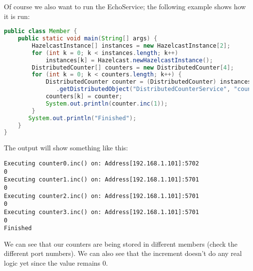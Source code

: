 Of course we also want to run the EchoService; the following example shows how it is run:
\begin{lstlisting}[language=java]
public class Member {
    public static void main(String[] args) {
        HazelcastInstance[] instances = new HazelcastInstance[2];
        for (int k = 0; k < instances.length; k++) 
            instances[k] = Hazelcast.newHazelcastInstance();
        DistributedCounter[] counters = new DistributedCounter[4];
        for (int k = 0; k < counters.length; k++) {
            DistributedCounter counter = (DistributedCounter) instances[0]
               .getDistributedObject("DistributedCounterService", "counter" + k);
            counters[k] = counter;
            System.out.println(counter.inc(1));
        }
       System.out.println("Finished");
    }
}
\end{lstlisting}

The output will show something like this:
\begin{lstlisting}
Executing counter0.inc() on: Address[192.168.1.101]:5702
0
Executing counter1.inc() on: Address[192.168.1.101]:5701
0
Executing counter2.inc() on: Address[192.168.1.101]:5701
0
Executing counter3.inc() on: Address[192.168.1.101]:5701
0
Finished
\end{lstlisting}
We can see that our counters are being stored in different members (check the different port numbers). We can also see that the increment doesn't do any real logic yet since the value remains 0.

